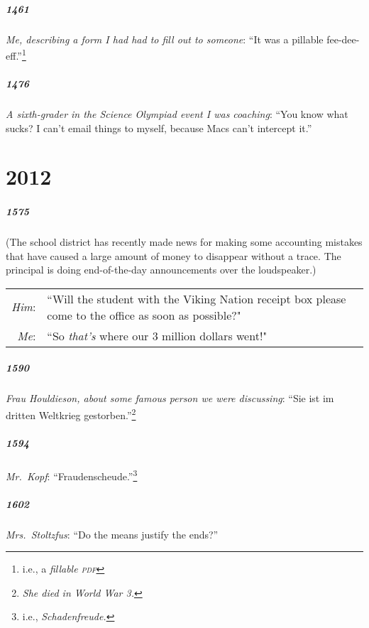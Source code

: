 \documentclass[10pt]{memoir}
\newcommand{\speakertag}[1]{\emph{#1}: }
\newcommand{\st}{\speakertag}
\newcommand{\intro}[1]{\emph{#1}}
\begin{document}
\paragraph{1461} \intro{Me, describing a form I had had to fill out to someone}: ``It was a pillable fee-dee-eff.''\thinspace\footnote{i.e., a \emph{fillable \textsc{pdf}}}

\paragraph{1476} \intro{A sixth-grader in the Science Olympiad event I was coaching}: ``You know what sucks? I can't email things to myself, because Macs can't intercept it.''

\chapter{2012}

\paragraph{1575} (The school district has recently made news for making some accounting mistakes that have caused a large amount of money to disappear without a trace. The principal is doing end-of-the-day announcements over the loudspeaker.)\\

\noindent \begin{tabularx}{\textwidth}{r X}
\st{Him} & ``Will the student with the Viking Nation receipt box please come to the office as soon as possible?"\\
\st{Me} & ``So \emph{that's} where our 3 million dollars went!"
\end{tabularx}

\paragraph{1590} \intro{Frau Houldieson, about some famous person we were discussing}: ``Sie ist im dritten Weltkrieg gestorben.''\thinspace\footnote{\emph{She died in World War 3.}}

\paragraph{1594} \intro{Mr.\ Kopf}: ``Fraudenscheude.''\thinspace\footnote{i.e., \emph{Schadenfreude.}}

\paragraph{1602} \intro{Mrs.\ Stoltzfus}: ``Do the means justify the ends?''
\end{document}
